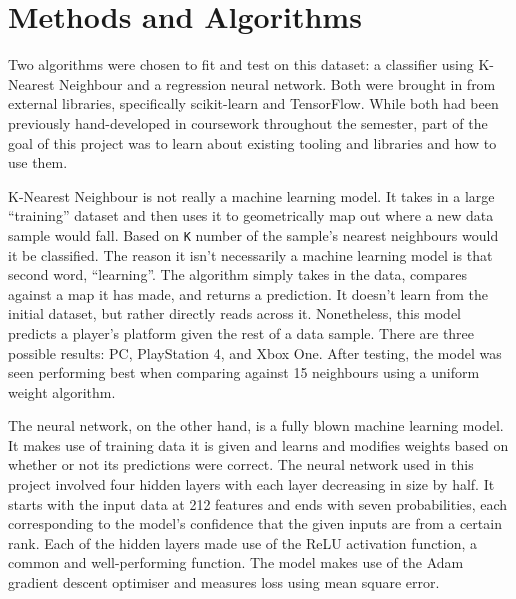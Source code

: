 \documentclass[12pt]{article}
\begin{document}
\section{Methods and Algorithms}
Two algorithms were chosen to fit and test on this dataset: a classifier using K-Nearest Neighbour and a regression neural network.
Both were brought in from external libraries, specifically scikit-learn and TensorFlow.
While both had been previously hand-developed in coursework throughout the semester, part of the goal of this project was to learn about existing tooling and libraries and how to use them.

K-Nearest Neighbour is not really a machine learning model.
It takes in a large ``training'' dataset and then uses it to geometrically map out where a new data sample would fall.
Based on \verb`K` number of the sample's nearest neighbours would it be classified.
The reason it isn't necessarily a machine learning model is that second word, ``learning''.
The algorithm simply takes in the data, compares against a map it has made, and returns a prediction.
It doesn't learn from the initial dataset, but rather directly reads across it.
Nonetheless, this model predicts a player's platform given the rest of a data sample.
There are three possible results: PC, PlayStation 4, and Xbox One.
After testing, the model was seen performing best when comparing against 15 neighbours using a uniform weight algorithm.

The neural network, on the other hand, is a fully blown machine learning model.
It makes use of training data it is given and learns and modifies weights based on whether or not its predictions were correct.
The neural network used in this project involved four hidden layers with each layer decreasing in size by half.
It starts with the input data at 212 features and ends with seven probabilities, each corresponding to the model's confidence that the given inputs are from a certain rank.
Each of the hidden layers made use of the ReLU activation function, a common and well-performing function.
The model makes use of the Adam gradient descent optimiser and measures loss using mean square error.

\newpage


\end{document}
